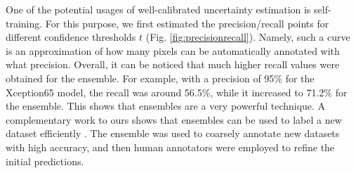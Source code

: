 \documentclass[conference]{IEEEtran}
\begin{document}
One of the potential usages of well-calibrated uncertainty estimation is self-training. For this purpose, we first estimated the precision/recall points for different confidence thresholds $t$ (Fig. \ref{fig:precisionrecall}). Namely, such a curve is an approximation of how many pixels can be automatically annotated with what precision. Overall, it can be noticed that much higher recall values were obtained for the ensemble. For example, with a precision of 95\% for the Xception65 model, the recall was around 56.5\%, while it increased to 71.2\% for the ensemble. This shows that ensembles are a very powerful technique. A complementary work to ours shows that ensembles can be used to label a new dataset efficiently \cite{edf}. The ensemble was used to coarsely annotate new datasets with high accuracy, 
and then human annotators were employed to refine the initial predictions.

\newcommand\x{90}
\def\rot{\rotatebox}
\end{document}
